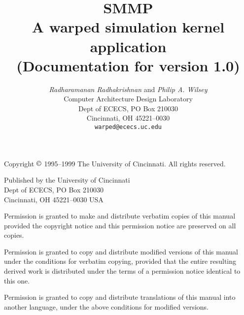 \documentclass[11pt]{report}
\newcommand{\version}{1.0}
\begin{document}
\title{
\textbf{SMMP}\\
A {\sc warped} simulation kernel application\\
(Documentation for version \version)}

\author{
\emph{Radharamanan Radhakrishnan} and \emph{Philip A.  Wilsey} \\
Computer Architecture Design Laboratory \\
Dept of ECECS, PO Box 210030 \\
Cincinnati, OH  45221--0030 \\
\texttt{warped@ececs.uc.edu}
}

\date{}

\maketitle

\vspace*{6in}

\noindent
Copyright $\copyright$ 1995--1999 The University of Cincinnati.  All
rights reserved.  

\bigskip

\noindent
Published by the University of Cincinnati \\
Dept of ECECS, PO Box 210030 \\
Cincinnati, OH  45221--0030 USA 

\bigskip

\noindent
Permission is granted to make and distribute verbatim copies of
this manual provided the copyright notice and this permission notice
are preserved on all copies.

\medskip
\noindent
Permission is granted to copy and distribute modified versions of this
manual under the conditions for verbatim copying, provided that the entire
resulting derived work is distributed under the terms of a permission
notice identical to this one.

\medskip
\noindent
Permission is granted to copy and distribute translations of this manual
into another language, under the above conditions for modified versions.

\newpage
\end{document}
